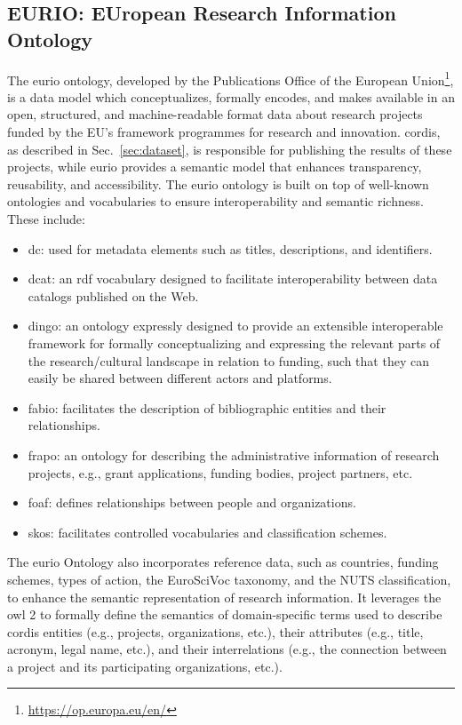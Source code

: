 \subsection*{EURIO: EUropean Research Information Ontology}
The \gls{eurio} ontology, developed by the Publications Office of the European Union\footnote{\url{https://op.europa.eu/en/}}, is a data model which conceptualizes, formally encodes, and makes available in an open, structured, and machine-readable format data about research projects funded by the EU's framework programmes for research and innovation.
\gls{cordis}, as described in Sec.~\ref{sec:dataset}, is responsible for publishing the results of these projects, while \gls{eurio} provides a semantic model that enhances transparency, reusability, and accessibility.
The \gls{eurio} ontology is built on top of well-known ontologies and vocabularies to ensure interoperability and semantic richness.
These include:
\begin{itemize}
    \item \gls{dc}: used for metadata elements such as titles, descriptions, and identifiers.
    \item \gls{dcat}: an \gls{rdf} vocabulary designed to facilitate interoperability between data catalogs published on the Web.
    \item \gls{dingo}: an ontology expressly designed to provide an extensible interoperable framework for formally conceptualizing and expressing the relevant parts of the research/cultural landscape in relation to funding, such that they can easily be shared between different actors and platforms.
    \item \gls{fabio}: facilitates the description of bibliographic entities and their relationships.
    \item \gls{frapo}: an ontology for describing the administrative information of research projects, e.g., grant applications, funding bodies, project partners, etc.
    \item \gls{foaf}: defines relationships between people and organizations.
    \item \gls{skos}: facilitates controlled vocabularies and classification schemes.
\end{itemize}

The \gls{eurio} Ontology also incorporates reference data, such as countries, funding schemes, types of action, the EuroSciVoc taxonomy, and the NUTS classification, to enhance the semantic representation of research information.
It leverages the \gls{owl} 2 to formally define the semantics of domain-specific terms used to describe \gls{cordis} entities (e.g., projects, organizations, etc.), their attributes (e.g., title, acronym, legal name, etc.), and their interrelations (e.g., the connection between a project and its participating organizations, etc.).

